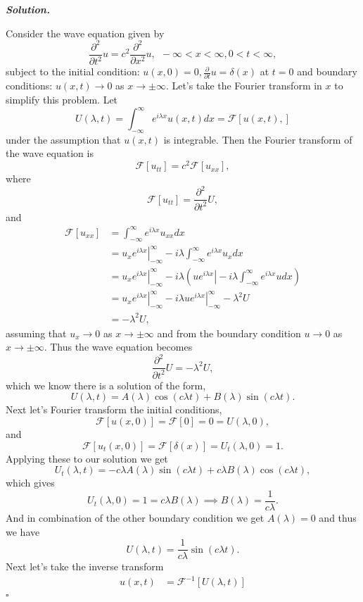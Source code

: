 \documentclass[12pt]{report}
\newenvironment{solution}[1][\it{Solution}]{\textbf{#1. } }{$\square$}
\def\F{{\mathcal{F}}}
\newcommand{\paren}[1]{{\left(#1\right)}} %
\newcommand{\pp}[2]{\frac{\partial #1}{\partial #2}} %
\newcommand{\ppn}[3]{\frac{\partial^{#1} #2}{\partial #3^{#1}}} %
\begin{document}
\begin{solution}

    \noindent
    Consider the wave equation given by
    \[\ppn{2}{}{t}u = c^2 \ppn{2}{}{x}u, ~~ -\infty < x < \infty, 0 < t < \infty,\]
    subject to the initial condition: $u(x,0) = 0, \pp{}{t}u=\delta(x)$ at $t=0$ and boundary conditions: $u(x,t) \to 0$ as $x \to \pm \infty$. Let's take the Fourier transform in $x$ to simplify this problem. Let
    \[ U(\lambda,t) = \int_{-\infty}^{\infty}e^{i\lambda x}u(x,t)dx = \F[u(x,t),]\]
    under the assumption that $u(x,t)$ is integrable. Then the Fourier transform of the wave equation is
    \[ 
    \F[u_{tt}] = c^2 \F[u_{xx}],
    \]
    where
    \[ \F[u_{tt}] = \ppn{2}{}{t}U,\]
    and
    \begin{align*}
        \F[u_{xx}] &= \int_{-\infty}^{\infty}e^{i\lambda x}u_{xx}dx\\ 
        &= \left. u_x e^{i\lambda x}\right|_{-\infty}^{\infty} - i\lambda\int_{-\infty}^{\infty}e^{i \lambda x}u_xdx\\
        &= \left. u_x e^{i\lambda x}\right|_{-\infty}^{\infty} - i \lambda \paren{\left. ue^{i\lambda x}\right| - i\lambda \int_{-\infty}^{\infty}e^{i\lambda x}u dx}\\
        &= \left. u_x e^{i\lambda x}\right|_{-\infty}^{\infty} - i\lambda \left. u e^{i\lambda x}\right|_{-\infty}^{\infty} - \lambda^2U\\
        &= -\lambda^2U,
    \end{align*}
    assuming that $u_x \to 0$ as $x \to \pm \infty$ and from the boundary condition $u \to 0$ as $x \to \pm \infty$. Thus the wave equation becomes
    \[ \ppn{2}{}{t}U = -\lambda^2 U,\]
    which we know there is a solution of the form,
    \[U(\lambda,t) = A(\lambda)\cos(c\lambda t) + B(\lambda)\sin(c\lambda t).\]
    Next let's Fourier transform the initial conditions,
    \[ 
        \F[u(x,0)] = \F[0] = 0 = U(\lambda,0),
    \]
    and
    \[ 
        \F[u_t(x,0)] = \F[\delta(x)] = U_t(\lambda,0) = 1.
    \]
    Applying these to our solution we get
    \[
        U_t(\lambda,t) = - c\lambda A(\lambda)\sin(c \lambda t) + c \lambda B(\lambda)\cos(c\lambda t),
    \]
    which gives
    \[ U_t(\lambda,0) = 1 = c\lambda B(\lambda) \implies B(\lambda) = \frac{1}{c\lambda}.\]
    And in combination of the other boundary condition we get $A(\lambda) = 0$ and thus we have
    \[ U(\lambda,t) = \frac{1}{c\lambda}\sin(c \lambda t).\]
    Next let's take the inverse transform
    \begin{align*}
        u(x,t) &= \F^{-1}[U(\lambda,t)]\\

\end{align*}
\end{solution}
\end{document}
